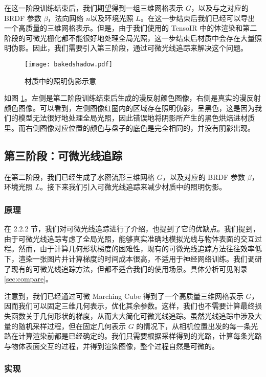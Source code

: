 在这一阶段训练结束后，我们期望得到一组三维网格表示 $G$，以及与之对应的 BRDF 参数 $\beta$，法向网络 $n$以及环境光照 $L$。在这一步结束后我们已经可以导出一个高质量的三维网格表示。但是，由于我们使用的 TensoIR 中的体渲染和第二阶段的可微光栅化都不能很好地处理全局光照，这一步结束后材质中会存在大量照明伪影。因此，我们需要引入第三阶段，通过可微光线追踪来解决这个问题。

\begin{figure}
  \centering
  \texttt{[image: bakedshadow.pdf]}
  \caption{材质中的照明伪影示意}
  \label{fig:bakedshadow}
\end{figure}

如图 \ref{fig:bakedshadow}。左侧是第二阶段训练结束后生成的漫反射颜色图像，右侧是真实的漫反射颜色图像。可以看到，左侧图像红圈内的区域存在照明伪影，呈黑色，这是因为我们的模型无法很好地处理全局光照，因此错误地将阴影所产生的黑色烘焙进材质里。而右侧图像对应位置的颜色与盘子的底色是完全相同的，并没有阴影出现。

\subsection{第三阶段：可微光线追踪}

在第二阶段，我们已经生成了水密流形三维网格 $G$，以及对应的 BRDF 参数 $\beta$，环境光照 $L$。接下来我们引入可微光线追踪来减少材质中的照明伪影。

\subsubsection{原理}

在 2.2.2 节，我们对可微光线追踪进行了介绍，也提到了它的优缺点。我们提到，由于可微光线追踪考虑了全局光照，能够真实准确地模拟光线与物体表面的交互过程。然而，由于计算几何形状梯度的困难性，现有的可微光线追踪方法往往效率低下，渲染一张图片并计算梯度的时间成本很高，不适用于神经网络训练。我们调研了现有的可微光线追踪方法，但都不适合我们的使用场景。具体分析可见附录 \ref{sec:compare}。

注意到，我们已经通过可微 Marching Cube 得到了一个高质量三维网格表示 $G$，因而我们可以固定三维几何表示，优化其余参数。这样，我们也不需要计算最终损失函数关于几何形状的梯度，从而大大简化可微光线追踪。虽然光线追踪中涉及大量的随机采样过程，但在固定几何表示 $G$ 的情况下，从相机位置出发的每一条光路在计算渲染前都是已经确定的。我们只需要根据采样得到的光路，计算每条光路与物体表面交互的过程，并得到渲染图像，整个过程自然是可微的。

\subsubsection{实现}

